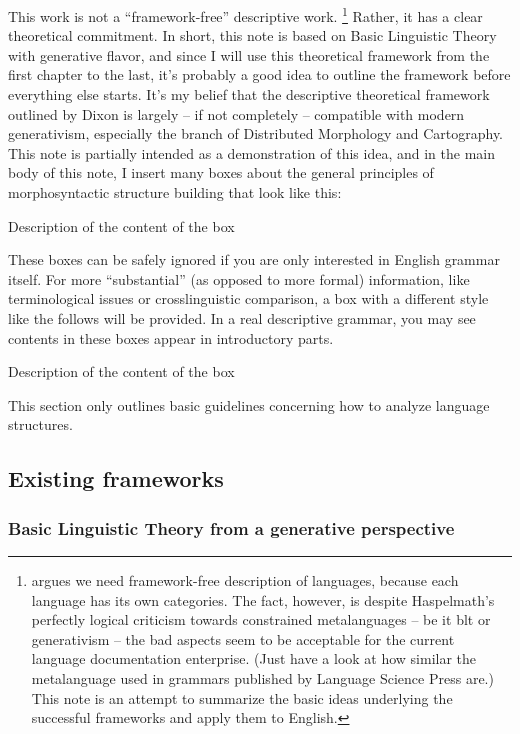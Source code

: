 \documentclass[UTF8, a4paper, oneside, scheme=plain]{ctexrep}
\begin{document}
This work is not a ``framework-free'' descriptive work.%
\footnote{
    \citet{frameworkfree} argues we need framework-free description of languages,
    because each language has its own categories.
    The fact, however, is despite Haspelmath's perfectly logical criticism towards 
    constrained metalanguages -- be it \acl{blt} or generativism -- 
    the bad aspects seem to be acceptable for the current language documentation enterprise.
    (Just have a look at how similar the metalanguage used in grammars published by Language Science Press are.)
    This note is an attempt to summarize the basic ideas underlying 
    the successful frameworks and apply them to English.
}
Rather, it has a clear theoretical commitment.
In short, this note is based on Basic Linguistic Theory \citep{dixon2009basic1,dixon2010basic2,dixon2012basic3}
with generative flavor,
and since I will use this theoretical framework from the first chapter to the last,
it's probably a good idea to outline the framework before everything else starts.
It's my belief that the descriptive theoretical framework outlined by Dixon 
is largely -- if not completely -- compatible with modern generativism,
especially the branch of Distributed Morphology and Cartography.
This note is partially intended as a demonstration of this idea,
and in the main body of this note, 
I insert many boxes about the general principles of morphosyntactic structure building 
that look like this:
\begin{theorybox*}{Description of the content of the box}
\end{theorybox*}
These boxes can be safely ignored if you are only interested in English grammar itself.
For more ``substantial'' (as opposed to more formal) information,
like terminological issues or crosslinguistic comparison,
a box with a different style like the follows will be provided.
In a real descriptive grammar,
you may see contents in these boxes appear in introductory parts.

\begin{infobox*}{Description of the content of the box}
\end{infobox*}

This section only outlines basic guidelines concerning how to analyze language structures.

\subsection{Existing frameworks}

\subsubsection{Basic Linguistic Theory from a generative perspective}
\end{document}
